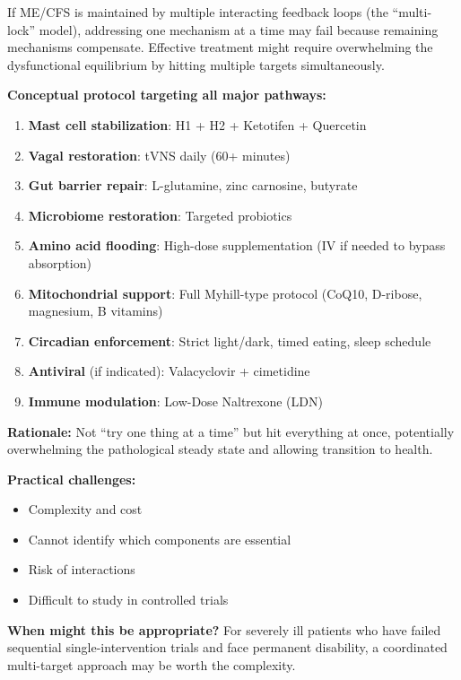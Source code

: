 \begin{hypothesis}
\label{hyp:kitchen-sink}
If ME/CFS is maintained by multiple interacting feedback loops (the ``multi-lock'' model), addressing one mechanism at a time may fail because remaining mechanisms compensate. Effective treatment might require overwhelming the dysfunctional equilibrium by hitting multiple targets simultaneously.

\textbf{Conceptual protocol targeting all major pathways:}
\begin{enumerate}
    \item \textbf{Mast cell stabilization}: H1 + H2 + Ketotifen + Quercetin
    \item \textbf{Vagal restoration}: tVNS daily (60+ minutes)
    \item \textbf{Gut barrier repair}: L-glutamine, zinc carnosine, butyrate
    \item \textbf{Microbiome restoration}: Targeted probiotics
    \item \textbf{Amino acid flooding}: High-dose supplementation (IV if needed to bypass absorption)
    \item \textbf{Mitochondrial support}: Full Myhill-type protocol (CoQ10, D-ribose, magnesium, B vitamins)
    \item \textbf{Circadian enforcement}: Strict light/dark, timed eating, sleep schedule
    \item \textbf{Antiviral} (if indicated): Valacyclovir + cimetidine
    \item \textbf{Immune modulation}: Low-Dose Naltrexone (LDN)
\end{enumerate}

\textbf{Rationale:} Not ``try one thing at a time'' but hit everything at once, potentially overwhelming the pathological steady state and allowing transition to health.

\textbf{Practical challenges:}
\begin{itemize}
    \item Complexity and cost
    \item Cannot identify which components are essential
    \item Risk of interactions
    \item Difficult to study in controlled trials
\end{itemize}

\textbf{When might this be appropriate?} For severely ill patients who have failed sequential single-intervention trials and face permanent disability, a coordinated multi-target approach may be worth the complexity.
\end{hypothesis}

